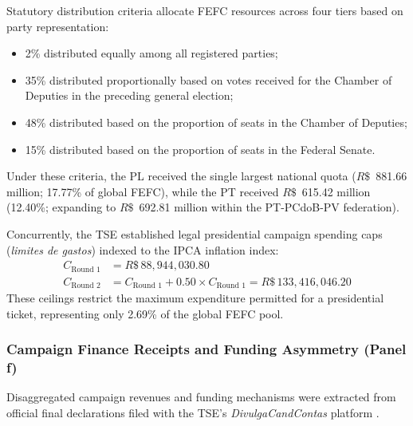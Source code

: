 Statutory distribution criteria allocate FEFC resources across four tiers based on party representation:
\begin{itemize}
    \item 2\% distributed equally among all registered parties;
    \item 35\% distributed proportionally based on votes received for the Chamber of Deputies in the preceding general election;
    \item 48\% distributed based on the proportion of seats in the Chamber of Deputies;
    \item 15\% distributed based on the proportion of seats in the Federal Senate.
\end{itemize}
Under these criteria, the PL received the single largest national quota ($R\$$~881.66 million; 17.77\% of global FEFC), while the PT received $R\$$~615.42 million (12.40\%; expanding to $R\$$~692.81 million within the PT-PCdoB-PV federation).

Concurrently, the TSE established legal presidential campaign spending caps (\emph{limites de gastos}) indexed to the IPCA inflation index:
\begin{align}
C_{\text{Round 1}} &= R\$\,88,944,030.80 \\
C_{\text{Round 2}} &= C_{\text{Round 1}} + 0.50 \times C_{\text{Round 1}} = R\$\,133,416,046.20
\end{align}
These ceilings restrict the maximum expenditure permitted for a presidential ticket, representing only 2.69\% of the global FEFC pool.

\subsubsection*{Campaign Finance Receipts and Funding Asymmetry (Panel f)}
Disaggregated campaign revenues and funding mechanisms were extracted from official final declarations filed with the TSE's \emph{DivulgaCandContas} platform \citep{tse2026divulgacand}. 

